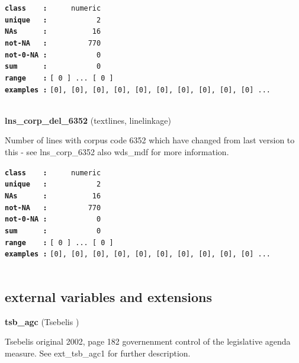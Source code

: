 \documentclass[]{article}
\begin{document}
\textbf{\texttt{class\ \ \ \ :}} \texttt{~~~~~numeric}\\
\textbf{\texttt{unique\ \ \ :}} \texttt{~~~~~~~~~~~2}\\
\textbf{\texttt{NAs\ \ \ \ \ \ :}} \texttt{~~~~~~~~~~16}\\
\textbf{\texttt{not-NA\ \ \ :}} \texttt{~~~~~~~~~770}\\
\textbf{\texttt{not-0-NA\ :}} \texttt{~~~~~~~~~~~0}\\
\textbf{\texttt{sum\ \ \ \ \ \ :}} \texttt{~~~~~~~~~~~0}\\
\textbf{\texttt{range\ \ \ \ :}}
\texttt{{[}\ 0\ {]}\ ...\ {[}\ 0\ {]}}\\
\textbf{\texttt{examples\ :}}
\texttt{{[}0{]},\ {[}0{]},\ {[}0{]},\ {[}0{]},\ {[}0{]},\ {[}0{]},\ {[}0{]},\ {[}0{]},\ {[}0{]},\ {[}0{]}\ ...}\\

~

\textbf{lns\_corp\_del\_6352} (textlines, linelinkage)

Number of lines with corpus code 6352 which have changed from last
version to this - see lns\_corp\_6352 also wds\_mdf for more
information.

\textbf{\texttt{class\ \ \ \ :}} \texttt{~~~~~numeric}\\
\textbf{\texttt{unique\ \ \ :}} \texttt{~~~~~~~~~~~2}\\
\textbf{\texttt{NAs\ \ \ \ \ \ :}} \texttt{~~~~~~~~~~16}\\
\textbf{\texttt{not-NA\ \ \ :}} \texttt{~~~~~~~~~770}\\
\textbf{\texttt{not-0-NA\ :}} \texttt{~~~~~~~~~~~0}\\
\textbf{\texttt{sum\ \ \ \ \ \ :}} \texttt{~~~~~~~~~~~0}\\
\textbf{\texttt{range\ \ \ \ :}}
\texttt{{[}\ 0\ {]}\ ...\ {[}\ 0\ {]}}\\
\textbf{\texttt{examples\ :}}
\texttt{{[}0{]},\ {[}0{]},\ {[}0{]},\ {[}0{]},\ {[}0{]},\ {[}0{]},\ {[}0{]},\ {[}0{]},\ {[}0{]},\ {[}0{]}\ ...}\\

~

\subsection{external variables and
extensions}\label{external-variables-and-extensions}

\textbf{tsb\_agc} (Tsebelis )

Tsebelis original 2002, page 182 governenment control of the legislative
agenda measure. See ext\_tsb\_agc1 for further description.
\end{document}
